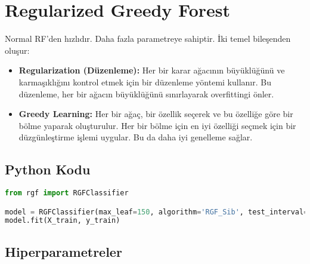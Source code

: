 \section{Regularized Greedy Forest}
Normal RF'den hızlıdır. Daha fazla parametreye sahiptir. İki temel bileşenden oluşur:

\begin{itemize}
    \item \textbf{Regularization (Düzenleme):} Her bir karar ağacının büyüklüğünü ve karmaşıklığını kontrol etmek için bir düzenleme yöntemi kullanır. Bu düzenleme, her bir ağacın büyüklüğünü sınırlayarak overfittingi önler.
    \item \textbf{Greedy Learning:} Her bir ağaç, bir özellik seçerek ve bu özelliğe göre bir bölme yaparak oluşturulur. Her bir bölme için en iyi özelliği seçmek için bir düzgünleştirme işlemi uygular. Bu da daha iyi genelleme sağlar.
\end{itemize}

\subsection{Python Kodu}

\begin{lstlisting}[language=Python]
from rgf import RGFClassifier

model = RGFClassifier(max_leaf=150, algorithm='RGF_Sib', test_interval=100)
model.fit(X_train, y_train)
\end{lstlisting}

\subsection{Hiperparametreler}
\begin{table}[h]
\centering
{\scriptsize\renewcommand{\arraystretch}{0.4}
{}}
\end{table}

\newpage
